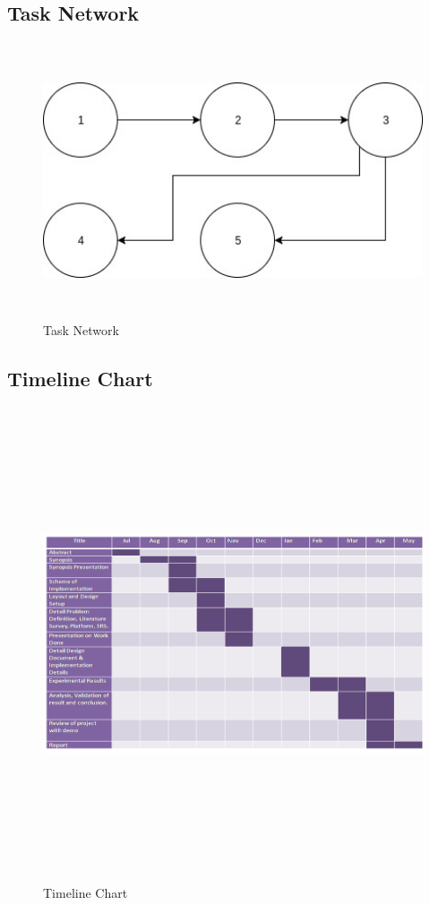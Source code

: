 \documentclass[oneside,a4paper,12pt]{pictreport}
\begin{document}
\subsection{Task Network}
\begin{figure}[!h]
\centering
\includegraphics[width=5.5in,height=3.2in]{task.jpg}
\caption{Task Network}
\end{figure}
\newpage
\subsection{Timeline Chart}
\begin{figure}[!h]
\centering
\includegraphics[width=5.5in,height=5.5in]{timeline.png}
\caption{Timeline Chart}
\end{figure}
\end{document}
